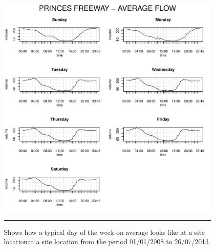 \begin{figure}[htbp]
  \centering
    \includegraphics[width=\textwidth,height=\textheight,keepaspectratio]{Figures/typical-day.pdf}
    \rule{35em}{0.5pt}
  \caption[Average traffic on each day of the week]{Shows how a typical day of the week on
  average looks like at a site locationat a site location from the period 01/01/2008 to 26/07/2013}
  \label{fig:TypicalDayTraffic1}
\end{figure}

